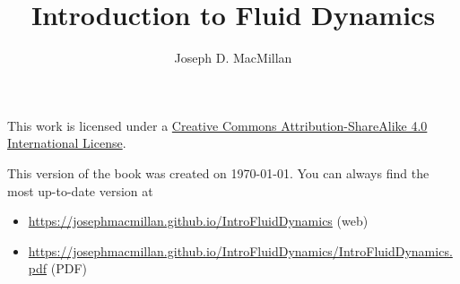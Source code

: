 \documentclass[10pt]{book}
\title{Introduction to Fluid Dynamics}
\author{Joseph D. MacMillan}
\date{}
\begin{document}
\maketitle

This work is licensed under a \href{https://creativecommons.org/licenses/by-sa/4.0/}{Creative Commons Attribution-ShareAlike 4.0 International License}.

\vspace{1in}

This version of the book was created on \today. You can always find the most up-to-date version at 
\begin{itemize}
\item \url{https://josephmacmillan.github.io/IntroFluidDynamics} (web)
\item \url{https://josephmacmillan.github.io/IntroFluidDynamics/IntroFluidDynamics.pdf} (PDF)
\end{itemize}


\tableofcontents







\appendix


\end{document}
